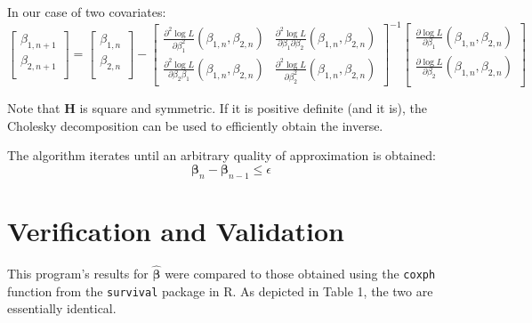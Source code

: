 \documentclass{article}
\begin{document}
In our case of two covariates:
\begin{equation}
	\begin{bmatrix}
		\beta_{1, n+1} \\
		\beta_{2, n+1} \\
	\end{bmatrix}
	=
	\begin{bmatrix}
		\beta_{1, n} \\
		\beta_{2, n} \\
	\end{bmatrix}
	-
	\begin{bmatrix}
		\frac{\partial^2 \log L}{\partial \beta_1^2}\left( \beta_{1,
		n}, \beta_{2, n} \right) &

		\frac{\partial^2 \log L}{\partial \beta_1 \partial \beta_2}\left( \beta_{1,
		n}, \beta_{2, n} \right) 
		
		\\

		\frac{\partial^2 \log L}{\partial \beta_2 \beta_1}\left( \beta_{1,
		n}, \beta_{2, n} \right) &

		\frac{\partial^2 \log L}{\partial \beta_2^2}\left( \beta_{1,
		n}, \beta_{2, n} \right) 
	\end{bmatrix}^{-1}
	\begin{bmatrix}
		\frac{\partial \log L}{\partial \beta_1}\left( \beta_{1, n},
		\beta_{2, n}\right) \\
		\frac{\partial \log L}{\partial \beta_2} \left( \beta_{1, n},
		\beta_{2, n} \right)\\
	\end{bmatrix}
\end{equation}

Note that $\bm{H}$ is square and symmetric. If it is positive definite (and it
is), the Cholesky decomposition can be used to efficiently obtain the inverse.

The algorithm iterates until an arbitrary quality of approximation is obtained:
\begin{equation}
	\bm{\beta}_{n} - \bm{\beta}_{n-1} \leq \epsilon
\end{equation}

\section*{Verification and Validation}
This program's results for $\bm{\hat{\beta}}$ were compared to those obtained using
the \texttt{coxph} function from the \texttt{survival} package in R. As depicted
in Table 1, the two are essentially identical.
\end{document}
